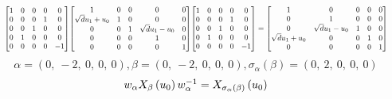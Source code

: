 \documentclass[11pt]{article}
\theoremstyle{definition}
\begin{document}
\[
\scaletoalign{\textwidth}{{\left[\begin{matrix}1 & 0 & 0 & 0 & 0\\0 & 0 & 0 & 1 & 0\\0 & 0 & 1 & 0 & 0\\0 & 1 & 0 & 0 & 0\\0 & 0 & 0 & 0 & -1\end{matrix}\right]} {\left[\begin{matrix}1 & 0 & 0 & 0 & 0\\\sqrt{d} u_{1} + u_{0} & 1 & 0 & 0 & 0\\0 & 0 & 1 & \sqrt{d} u_{1} - u_{0} & 0\\0 & 0 & 0 & 1 & 0\\0 & 0 & 0 & 0 & 1\end{matrix}\right]} {\left[\begin{matrix}1 & 0 & 0 & 0 & 0\\0 & 0 & 0 & 1 & 0\\0 & 0 & 1 & 0 & 0\\0 & 1 & 0 & 0 & 0\\0 & 0 & 0 & 0 & -1\end{matrix}\right]} = {\left[\begin{matrix}1 & 0 & 0 & 0 & 0\\0 & 1 & 0 & 0 & 0\\0 & \sqrt{d} u_{1} - u_{0} & 1 & 0 & 0\\\sqrt{d} u_{1} + u_{0} & 0 & 0 & 1 & 0\\0 & 0 & 0 & 0 & 1\end{matrix}\right]}}
\]
\[
\alpha = \left( 0, \  -2, \  0, \  0, \  0\right), \beta = \left( 0, \  -2, \  0, \  0, \  0\right), \sigma_{\alpha}(\beta) = \left( 0, \  2, \  0, \  0, \  0\right)
\]
\[
\scaletoalign{\textwidth}{w_{\alpha} X_{\beta}\left(u_{0}\right) w_{\alpha}^{-1} = X_{\sigma_{\alpha}\left(\beta\right)}\left(u_{0}\right)}
\]
\end{document}
